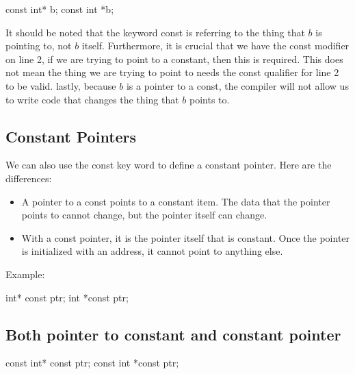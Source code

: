 \documentclass{report}
\begin{document}
    \begin{cppcode}
const int* b; 
const int *b;
    \end{cppcode}
    
    \bigbreak \noindent 
    \begin{notebox}
			It should be noted that the keyword const is referring to the thing that $b$ is pointing to, not $b$ itself. Furthermore, it is crucial that we have the const modifier on line 2, if we are trying to point to a constant, then this is required. This does not mean the thing we are trying to point to needs the const qualifier for line 2 to be valid. lastly, because $b$ is a pointer to a const, the compiler will not allow us to write code that changes the thing that $b$ points to.
		\end{notebox}
    \bigbreak \noindent 

    \pagebreak
    \subsection{Constant Pointers}
    \bigbreak \noindent 
    We can also use the const key word to define a constant pointer. Here are the differences:
    \begin{itemize}
        \item A pointer to a const points to a constant item. The data that the pointer points to cannot change, but the pointer itself can change. 
        \item With a const pointer, it is the pointer itself that is constant.  Once the pointer is initialized with an address, it cannot point to anything else.
    \end{itemize}
    \bigbreak \noindent 
    Example:
    \bigbreak \noindent 
    
    \begin{cppcode}
int* const ptr;
int *const ptr;
    \end{cppcode}
    

    \bigbreak \noindent 
    \subsection{Both pointer to constant and constant pointer}
    \bigbreak \noindent 
    
    \begin{cppcode}
const int* const ptr;
const int *const ptr;
    \end{cppcode}
    

    \bigbreak \noindent 
\end{document}
